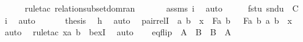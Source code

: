 \begin{isabellebody}
\ \ \ \ \isamarkupfalse%
\ {\isacharparenleft}{\kern0pt}rule{\isacharunderscore}{\kern0pt}tac\ relation{\isacharunderscore}{\kern0pt}subset{\isacharunderscore}{\kern0pt}domran{\isacharparenright}{\kern0pt}\ \isanewline
\ \ \ \ \isamarkupfalse%
\ assms\ i\ \isamarkupfalse%
\ auto\isanewline
\ \ \isamarkupfalse%
\ \isamarkupfalse%
\ {\isachardoublequoteopen}{\isacharless}{\kern0pt}fst{\isacharparenleft}{\kern0pt}u{\isacharparenright}{\kern0pt}{\isacharcomma}{\kern0pt}\ snd{\isacharparenleft}{\kern0pt}u{\isacharparenright}{\kern0pt}{\isachargreater}{\kern0pt}\ {\isasymin}\ C{\isachardoublequoteclose}\ \isamarkupfalse%
\ i\ \isamarkupfalse%
\ auto\ \isanewline
\ \ \isamarkupfalse%
\ \isamarkupfalse%
\ {\isacharquery}{\kern0pt}thesis\ \isamarkupfalse%
\ h\ \isamarkupfalse%
\ auto\ \isanewline
{}\isamarkupfalse%
%
\endisatagproof
{\isafoldproof}%
%
\isadelimproof
\isanewline
%
\endisadelimproof
\isanewline
{}\isamarkupfalse%
\ pair{\isacharunderscore}{\kern0pt}relI\ {\isacharcolon}{\kern0pt}\ {\isachardoublequoteopen}{\isacharless}{\kern0pt}a{\isacharcomma}{\kern0pt}\ b{\isachargreater}{\kern0pt}\ {\isasymin}\ x\ {\isasymLongrightarrow}\ F{\isacharparenleft}{\kern0pt}a{\isacharcomma}{\kern0pt}\ b{\isacharparenright}{\kern0pt}\ {\isasymin}\ {\isacharbraceleft}{\kern0pt}\ F{\isacharparenleft}{\kern0pt}a{\isacharcomma}{\kern0pt}\ b{\isacharparenright}{\kern0pt}{\isachardot}{\kern0pt}\ {\isacharless}{\kern0pt}a{\isacharcomma}{\kern0pt}\ b{\isachargreater}{\kern0pt}\ {\isasymin}\ x\ {\isacharbraceright}{\kern0pt}{\isachardoublequoteclose}\isanewline
%
\isadelimproof
\ \ %
\endisadelimproof
%
\isatagproof
{}\isamarkupfalse%
\ auto\ \isamarkupfalse%
\ {\isacharparenleft}{\kern0pt}rule{\isacharunderscore}{\kern0pt}tac\ x{\isacharequal}{\kern0pt}{\isachardoublequoteopen}{\isacharless}{\kern0pt}a{\isacharcomma}{\kern0pt}\ b{\isachargreater}{\kern0pt}{\isachardoublequoteclose}\ \ bexI{\isacharparenright}{\kern0pt}\ \isamarkupfalse%
\ auto\ \isamarkupfalse%
%
\endisatagproof
{\isafoldproof}%
%
\isadelimproof
\ \isanewline
%
\endisadelimproof
\isanewline
{}\isamarkupfalse%
\ eq{\isacharunderscore}{\kern0pt}flip\ {\isacharcolon}{\kern0pt}\ {\isachardoublequoteopen}A\ {\isacharequal}{\kern0pt}\ B\ {\isasymLongrightarrow}\ B\ {\isacharequal}{\kern0pt}\ A{\isachardoublequoteclose}%

\end{isabellebody}
